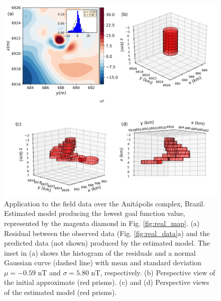\begin{figure}
	\centering
	\includegraphics[scale=.5]{figures/real_results2.png}
	\caption{Application to the field data over the Anitápolis complex, Brazil.
	Estimated model producing the lowest goal function value, 
	represented by the magenta diamond in Fig. \ref{fig:real_map}.
	(a) Residual between the observed data (Fig. \ref{fig:real_data}a) and the 
	predicted data (not shown) produced by the estimated model. 
	The inset in (a) shows the histogram of the residuals and a normal 
	Gaussian curve (dashed line) with mean and standard deviation 
	$\mu = -0.59$ nT and $\sigma = 5.80$ nT, respectively. 
	(b) Perspective view of the initial approximate (red prisms). 
	(c) and (d) Perspective views of the estimated model (red prisms).}
	\label{fig:real_result2}
\end{figure}


